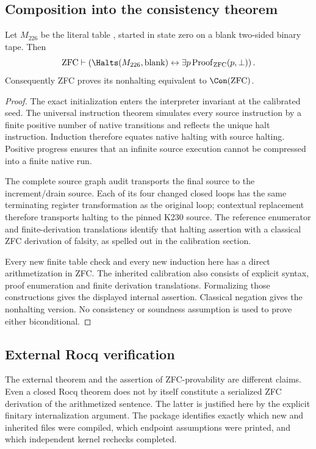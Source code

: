 \subsection{Composition into the consistency theorem}

\begin{theorem}
Let $M_{226}$ be the literal table , started in
state zero on a blank two-sided binary tape. Then
\[
\mathrm{ZFC}\vdash
\left(\Halts(M_{226},\mathrm{blank})\leftrightarrow
          \exists p\,\mathrm{Proof}_{\mathrm{ZFC}}(p,\bot)\right).
\]
Consequently ZFC proves its nonhalting equivalent to \(\Con(\mathrm{ZFC})\).
\end{theorem}
\begin{proof}
The exact initialization enters the interpreter invariant at the
calibrated seed. The universal instruction theorem simulates every source
instruction by a finite positive number of native transitions and
reflects the unique halt instruction. Induction therefore equates native
halting with source halting. Positive progress ensures that an infinite
source execution cannot be compressed into a finite native run.

The complete source graph audit transports the final source to the
increment/drain source. Each of its four changed closed loops has the
same terminating register transformation as the original loop; contextual
replacement therefore transports halting to the pinned K230 source.
The reference enumerator and finite-derivation translations identify
that halting assertion with a classical ZFC derivation of falsity, as
spelled out in the calibration section.

Every new finite table check and every new induction here has a direct
arithmetization in ZFC. The inherited calibration also consists of
explicit syntax, proof enumeration and finite derivation translations.
Formalizing those constructions gives the displayed internal assertion.
Classical negation gives the nonhalting version. No consistency or
soundness assumption is used to prove either biconditional.
\end{proof}

\subsection{External Rocq verification}


The external theorem and the assertion of ZFC-provability are different
claims. Even a closed Rocq theorem does not by itself constitute a
serialized ZFC derivation of the arithmetized sentence. The latter is
justified here by the explicit finitary internalization argument. The
package identifies exactly which new and inherited files were compiled, which endpoint assumptions were printed, and which independent kernel
rechecks completed.

